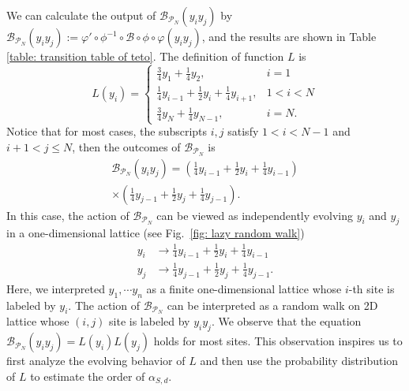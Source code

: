 \documentclass[journal=jctcce,a4paper,manuscript=article]{achemso}
\begin{document}
\newcommand{\teto}{\mathcal{B}_{\mathcal{P}_N}}
We can calculate the output of $\teto (y_iy_j)$ by $\teto(y_i y_j) := \varphi' \circ \phi^{-1} \circ \mathcal{B}\circ \phi \circ \varphi(y_i y_j)$, and the results are shown in Table \ref{table: transition table of teto}. The definition of function $L$ is
\begin{equation}
  \label{eq: lazy random walk L}
  L\left(y_i\right)=
  \begin{cases}
    \frac{3}{4} y_1+\frac{1}{4} y_2,                         & i=1   \\
    \frac{1}{4} y_{i-1}+\frac{1}{2} y_i+\frac{1}{4} y_{i+1}, & 1<i<N \\
    \frac{3}{4} y_N+\frac{1}{4} y_{N-1},                     & i=N.
  \end{cases}
\end{equation}
Notice that for most cases, the subscripts $i,j$ satisfy $1<i<N-1$ and $i+1<j\leq N$, then the outcomes of $\teto$ is
\begin{equation}
  \label{eq: zz anonymous 5}
  \begin{aligned}
    \teto (y_iy_j) = \left(\frac{1}{4} y_{i-1} + \frac{1}{2}y_i + \frac{1}{4} y_{i-1}\right) \\
    \times \left( \frac{1}{4} y_{j-1} + \frac{1}{2}y_j + \frac{1}{4} y_{j-1} \right).
  \end{aligned}
\end{equation}
In this case, the action of $\teto$ can be viewed as independently evolving $y_i$ and $y_j$ in a one-dimensional lattice (see Fig.~\ref{fig: lazy random walk})
\begin{equation}
  \label{eq: separate evolution}
  \begin{aligned}
    y_i & \to \frac{1}{4} y_{i-1} + \frac{1}{2}y_i + \frac{1}{4} y_{i-1}  \\
    y_j & \to \frac{1}{4} y_{j-1} + \frac{1}{2}y_j + \frac{1}{4} y_{j-1}.
  \end{aligned}
\end{equation}
Here, we interpreted $y_1, \cdots y_n$ as a finite one-dimensional lattice whose $i$-th site is labeled by $y_i$. The action of $\mathcal{B}_{\mathcal{P}_N}$ can be interpreted as a random walk on 2D lattice whose $(i,j)$ site is labeled by $y_iy_j$.
We observe that the equation $\mathcal{B}_{\mathcal{P}_N}(y_iy_j) = L(y_i)L(y_j)$ holds for most sites. This observation inspires us to first analyze the evolving behavior of $L$ and then use the probability distribution of $L$ to estimate the order of $\alpha_{S,d}$.
\end{document}
